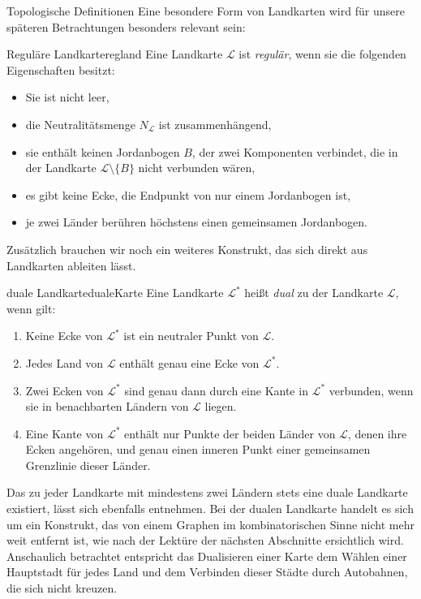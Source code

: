 \begin{section}{Topologische Definitionen}
 Eine besondere Form von Landkarten wird für unsere späteren Betrachtungen besonders relevant sein:
 
 \begin{definitionl}{Reguläre Landkarte}{regland}
  Eine Landkarte $\mathcal{L}$ ist \textit{regulär}, wenn sie die folgenden Eigenschaften besitzt:
  \begin{itemize}
   \item Sie ist nicht leer,
   \item die Neutralitätsmenge $N_{\mathcal{L}}$ ist zusammenhängend,
   \item sie enthält keinen Jordanbogen $B$, der zwei Komponenten verbindet, die in der Landkarte $\mathcal{L} \setminus \{B\}$ nicht verbunden wären,
   \item es gibt keine Ecke, die Endpunkt von nur einem Jordanbogen ist,
   \item je zwei Länder berühren höchstens einen gemeinsamen Jordanbogen.
  \end{itemize}
 \end{definitionl}
 
 Zusätzlich brauchen wir noch ein weiteres Konstrukt, das sich direkt aus Landkarten ableiten lässt.

 \begin{definitionl}{duale Landkarte}{dualeKarte}
  Eine Landkarte $\mathcal{L}^*$ heißt \textit{dual} zu der Landkarte $\mathcal{L}$, wenn gilt:
  \begin{enumerate}
   \item Keine Ecke von $\mathcal{L}^*$ ist ein neutraler Punkt von $\mathcal{L}$.
   \item Jedes Land von $\mathcal{L}$ enthält genau eine Ecke von $\mathcal{L}^*$.
   \item Zwei Ecken von $\mathcal{L}^*$ sind genau dann durch eine Kante in $\mathcal{L}^*$ verbunden, wenn sie in benachbarten Ländern von $\mathcal{L}$ liegen.
   \item Eine Kante von $\mathcal{L}^*$ enthält nur Punkte der beiden Länder von $\mathcal{L}$, denen ihre Ecken angehören, und genau einen inneren Punkt einer gemeinsamen Grenzlinie dieser Länder.
  \end{enumerate}
 \end{definitionl}
 
 Das zu jeder Landkarte mit mindestens zwei Ländern stets eine duale Landkarte existiert, lässt sich ebenfalls \cite{fritsch} entnehmen. Bei der dualen Landkarte handelt es sich um ein Konstrukt, das von einem Graphen im kombinatorischen Sinne nicht mehr weit entfernt ist, wie nach der Lektüre der nächsten Abschnitte ersichtlich wird. Anschaulich betrachtet entspricht das Dualisieren einer Karte dem Wählen einer Hauptstadt für jedes Land und dem Verbinden dieser Städte durch Autobahnen, die sich nicht kreuzen.
 

\end{section}
